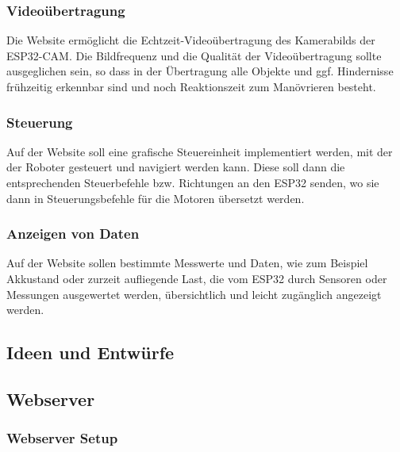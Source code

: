 \documentclass[ngerman,12pt,a4paper]{article}
\begin{document}
			\subsubsection*{Videoübertragung} 	 
	
	Die Website ermöglicht die Echtzeit-Videoübertragung des Kamerabilds der ESP32-CAM. Die Bildfrequenz und die Qualität der Videoübertragung sollte ausgeglichen sein, so dass in der Übertragung alle Objekte und ggf. Hindernisse frühzeitig erkennbar sind und noch Reaktionszeit zum Manövrieren besteht. 
	
			\subsubsection*{Steuerung}
	
	Auf der Website soll eine grafische Steuereinheit implementiert werden, mit der der Roboter gesteuert und navigiert werden kann. Diese soll dann die entsprechenden Steuerbefehle bzw. Richtungen an den ESP32 senden, wo sie dann in Steuerungsbefehle für die Motoren übersetzt werden.  
	
			\subsubsection*{Anzeigen von Daten}
	
	Auf der Website sollen bestimmte Messwerte und Daten, wie zum Beispiel Akkustand oder zurzeit aufliegende Last, die vom ESP32 durch Sensoren oder Messungen ausgewertet werden, übersichtlich und leicht zugänglich angezeigt werden.
	
		\subsection{Ideen und Entwürfe}
		
		\subsection{Webserver}
		
			\subsubsection{Webserver Setup}
			
\end{document}
